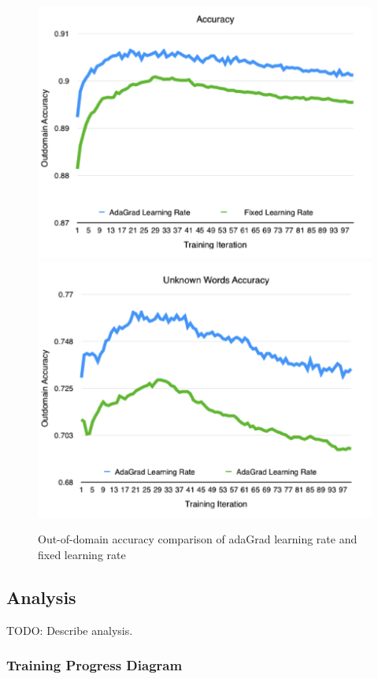 \documentclass[11pt]{article}
\begin{document}
\begin{figure}
	\includegraphics[scale=0.5]{outdomain_adagrad.png}
	\includegraphics[scale=0.5]{outdomain_adagrad_unkown.png}
	\caption{Out-of-domain accuracy  comparison of adaGrad learning rate and fixed learning rate}\label{Adagrad_fig}
\end{figure}
\subsection{Analysis}

TODO: Describe analysis.

\subsubsection{Training Progress Diagram}
\end{document}

